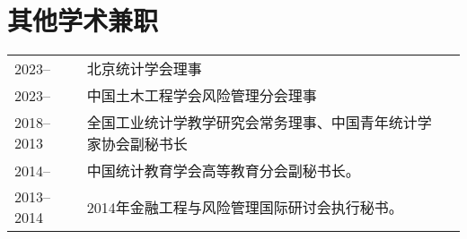 \documentclass[twoside,a4paper,11pt]{article}
\begin{document}
\section{其他学术兼职}
\begin{tabular}{l p{} l}
  2023--     & 北京统计学会理事                 \\
  2023--     & 中国土木工程学会风险管理分会理事 \\
  2018--2013 & 全国工业统计学教学研究会常务理事、中国青年统计学家协会副秘书长 \\
  2014--     & 中国统计教育学会高等教育分会副秘书长。                         \\
  2013--2014 & 2014年金融工程与风险管理国际研讨会执行秘书。                   \\
\end{tabular}


\end{document}
